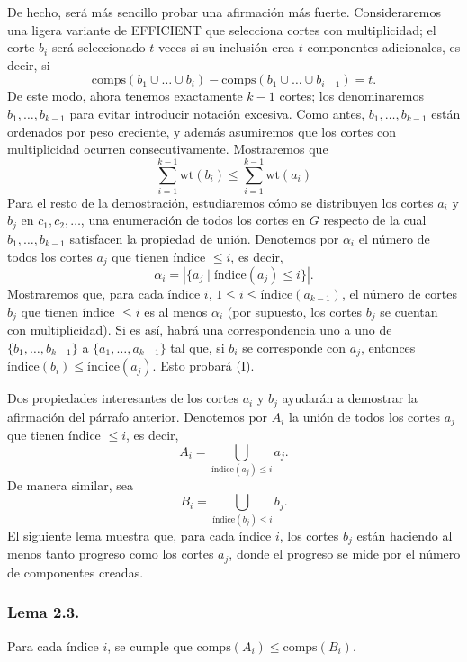 \documentclass{article}
\begin{document}
De hecho, será más sencillo probar una afirmación más fuerte. Consideraremos una ligera variante de \textsc{EFFICIENT} que selecciona cortes con multiplicidad; el corte \( b_i \) será seleccionado \( t \) veces si su inclusión crea \( t \) componentes adicionales, es decir, si
\[
\text{comps}(b_1 \cup \dots \cup b_i) - \text{comps}(b_1 \cup \dots \cup b_{i-1}) = t.
\]
De este modo, ahora tenemos exactamente \( k - 1 \) cortes; los denominaremos \( b_1, \dots, b_{k-1} \) para evitar introducir notación excesiva. Como antes, \( b_1, \dots, b_{k-1} \) están ordenados por peso creciente, y además asumiremos que los cortes con multiplicidad ocurren consecutivamente. Mostraremos que
\[
\sum_{i=1}^{k-1} \text{wt}(b_i) \leq \sum_{i=1}^{k-1} \text{wt}(a_i) \tag{I}
\]
Para el resto de la demostración, estudiaremos cómo se distribuyen los cortes \( a_i \) y \( b_j \) en \( c_1, c_2, \dots \), una enumeración de todos los cortes en \( G \) respecto de la cual \( b_1, \dots, b_{k-1} \) satisfacen la propiedad de unión. Denotemos por \( \alpha_i \) el número de todos los cortes \( a_j \) que tienen índice \( \leq i \), es decir,
\[
\alpha_i = \left| \{ a_j \mid \text{índice}(a_j) \leq i \} \right|.
\]
Mostraremos que, para cada índice \( i \), \( 1 \leq i \leq \text{índice}(a_{k-1}) \), el número de cortes \( b_j \) que tienen índice \( \leq i \) es al menos \( \alpha_i \) (por supuesto, los cortes \( b_j \) se cuentan con multiplicidad). Si es así, habrá una correspondencia uno a uno de \( \{b_1, \dots, b_{k-1}\} \) a \( \{a_1, \dots, a_{k-1}\} \) tal que, si \( b_i \) se corresponde con \( a_j \), entonces \( \text{índice}(b_i) \leq \text{índice}(a_j) \). Esto probará (I).

Dos propiedades interesantes de los cortes \( a_i \) y \( b_j \) ayudarán a demostrar la afirmación del párrafo anterior. Denotemos por \( A_i \) la unión de todos los cortes \( a_j \) que tienen índice \( \leq i \), es decir,
\[
A_i = \bigcup_{\text{índice}(a_j)\leq i} a_j.
\]
De manera similar, sea
\[
B_i = \bigcup_{\text{índice}(b_j)\leq i} b_j.
\]
El siguiente lema muestra que, para cada índice \( i \), los cortes \( b_j \) están haciendo al menos tanto progreso como los cortes \( a_j \), donde el progreso se mide por el número de componentes creadas.

\subsubsection*{Lema 2.3.} 
Para cada índice \( i \), se cumple que \( \text{comps}(A_i) \leq \text{comps}(B_i) \).
\end{document}

